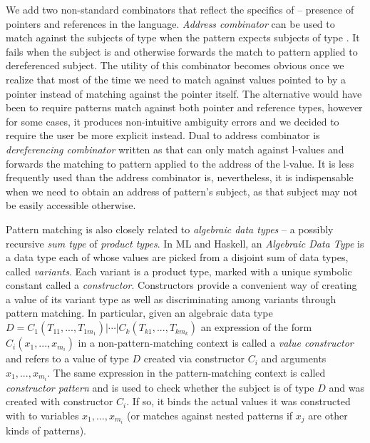 We add two non-standard combinators that reflect the specifics of \Cpp{} -- 
presence of pointers and references in the language. \emph{Address combinator} 
 can be used to match against the subjects of type  when the 
pattern  expects subjects of type . It fails when the subject 
is  and otherwise forwards the match to pattern  applied 
to dereferenced subject. The utility of this combinator becomes obvious once we 
realize that most of the time we need to match against values pointed to by a 
pointer instead of matching against the pointer itself. The alternative would 
have been to require patterns match against both pointer and reference types, 
however for some cases, it produces non-intuitive ambiguity errors and we decided 
to require the user be more explicit instead. Dual to address combinator 
is \emph{dereferencing combinator} written as  that can only match 
against l-values and forwards the matching to pattern  applied to the 
address of the l-value. It is less frequently used than the address combinator is, 
nevertheless, it is indispensable when we need to obtain an address of pattern's 
subject, as that subject may not be easily accessible otherwise.


Pattern matching is also closely related to \emph{algebraic data types} -- a 
possibly recursive \emph{sum type} of \emph{product types}. In ML and Haskell, an 
\emph{Algebraic Data Type} is a data type each of whose values are picked from a 
disjoint sum of data types, called \emph{variants}. Each variant is a product 
type, marked with a unique symbolic constant called a \emph{constructor}. 
Constructors provide a convenient way of creating a value of its variant type as 
well as discriminating among variants through pattern matching. In particular,
given an algebraic data type $D = C_1(T_{11},...,T_{1m_1}) | \cdots | C_k(T_{k1},...,T_{km_k})$
an expression of the form $C_i(x_1,...,x_{m_i})$ in a non-pattern-matching 
context is called a \emph{value constructor} and refers to a value of type $D$ 
created via constructor $C_i$ and arguments $x_1,...,x_{m_i}$. The same 
expression in the pattern-matching context is called \emph{constructor pattern} 
and is used to check whether the subject is of type $D$ and was created with 
constructor $C_i$. If so, it binds the actual values it was constructed with to  
variables $x_1,...,x_{m_i}$ (or matches against nested patterns if $x_j$ are 
other kinds of patterns).

